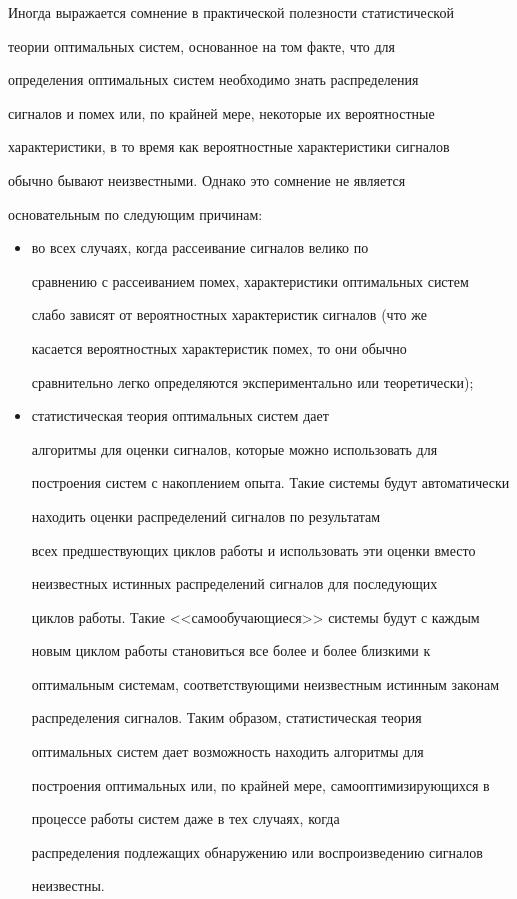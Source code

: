 Иногда выражается сомнение в практической полезности статистической


теории оптимальных систем, основанное на том факте, что для


определения оптимальных систем необходимо знать распределения


сигналов и помех или, по крайней мере, некоторые их вероятностные


характеристики, в то время как вероятностные характеристики сигналов


обычно бывают неизвестными. Однако это сомнение не является


основательным по следующим причинам:


\begin{itemize}


\item  во всех случаях, когда рассеивание сигналов велико по


сравнению с рассеиванием помех, характеристики оптимальных систем


слабо зависят от вероятностных характеристик сигналов (что же


касается вероятностных характеристик помех, то они обычно


сравнительно легко определяются экспериментально или теоретически);


\item 


статистическая теория оптимальных систем дает


алгоритмы  для оценки сигналов, которые  можно использовать для


построения систем с накоплением опыта. Такие системы будут автоматически


находить  оценки  распределений сигналов по результатам


всех предшествующих циклов работы  и использовать эти оценки вместо


неизвестных истинных  распределений сигналов для последующих


циклов работы. Такие <<самообучающиеся>> системы будут с каждым


новым циклом работы  становиться все более и более близкими к


оптимальным системам, соответствующими неизвестным истинным законам


распределения  сигналов. Таким образом, статистическая теория


оптимальных систем дает возможность находить алгоритмы для


построения оптимальных или,  по крайней мере, самооптимизирующихся в


процессе работы систем даже в тех случаях, когда


распределения подлежащих  обнаружению или воспроизведению сигналов


неизвестны.


\end{itemize}





